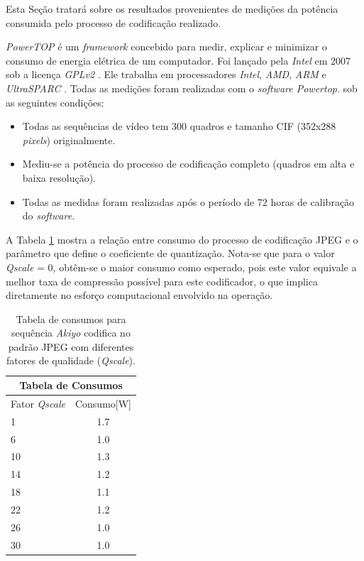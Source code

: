Esta Seção tratará sobre os resultados provenientes de medições da potência consumida pelo processo de codificação realizado.

\textit{PowerTOP} é um\textit{ framework} concebido para medir, explicar e minimizar o consumo de energia elétrica de um computador. Foi lançado pela \textit{Intel} em 2007 sob a licença \textit{GPLv2} . Ele trabalha em processadores \textit{Intel}, \textit{AMD}, \textit{ARM} e \textit{UltraSPARC} \cite{powertop}. 
 Todas as medições foram realizadas com o \textit{software Powertop}. sob as seguintes condições:
\begin{itemize}
\item Todas as sequências de vídeo tem 300 quadros e tamanho CIF (352x288 \textit{pixels}) originalmente.
\item Mediu-se a potência do processo de codificação completo (quadros em alta e baixa resolução).
\item Todas as medidas foram realizadas após o período de 72 horas de calibração do \textit{software}.
\end{itemize}


A Tabela \ref{akiyoConsumo} mostra a relação entre consumo do processo de codificação JPEG e o parâmetro que define o coeficiente de quantização. Nota-se  que para o valor \textit{Qscale} = 0, obtêm-se o maior consumo como esperado, pois este valor equivale a melhor taxa de compressão possível para este codificador, o que implica diretamente no esforço computacional envolvido na operação. 

\begin{table}[hbt]
\centering
\caption{Tabela de consumos para sequência \textit{Akiyo} codifica no padrão JPEG com diferentes fatores de qualidade (\textit{Qscale}).}	
\label{akiyoConsumo}
\begin{tabular}{|l|c|}
\hline
\multicolumn{2}{|c|}{\textbf{Tabela de Consumos}}\\
\hline
\hline			
Fator \textit{Qscale}	    & Consumo[W]  \\
\hline
\hline
1 & 1.7\\
\hline
6 & 1.0\\
\hline
10 & 1.3\\
\hline
14 & 1.2\\
\hline
18 & 1.1\\
\hline
22 & 1.2\\
\hline
26 & 1.0\\
\hline
30 & 1.0\\ 
\hline
\end{tabular}
\end{table}


